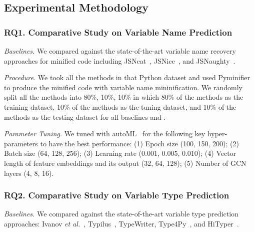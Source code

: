 \subsection{Experimental Methodology}
\label{empirical-method}

\subsubsection{RQ1. Comparative Study on Variable Name Prediction\\}
{\em Baselines.} We compared {\tool} against the state-of-the-art
variable name recovery approaches for minified code including
JSNeat~\cite{tran2019recovering}, JSNice~\cite{JSNice2015}, and
JSNaughty~\cite{JSNaughty2017}.

\textit{Procedure.} We took all the methods in that Python dataset
and used Pyminifier to produce the minified code with variable name
mininification. We randomly split all the methods into 80\%, 10\%,
10\% in which 80\% of the methods as the training dataset, 10\% of the
methods as the tuning dataset, and 10\% of the methods as the testing
dataset for all baselines and {\tool}.


{\em Parameter Tuning.} We tuned {\tool} with autoML~\cite{NNI} for
the following key hyper-parameters to have the best performance: (1)
Epoch size (100, 150, 200); (2) Batch size (64, 128, 256); (3)
Learning rate (0.001, 0.005, 0.010); (4) Vector length of feature
embeddings and its output (32, 64, 128); (5) Number of GCN layers (4,
8, 16).

\subsubsection{RQ2. Comparative Study on Variable Type Prediction\\}

{\em Baselines.} We compared {\tool} against the state-of-the-art
  variable type prediction approaches: Ivanov {\em et
  al.}~\cite{ivanov21predicting}, Typilus~\cite{typilus-pldi20},
  TypeWriter\cite{typewriter-fse20}, Type4Py~\cite{Type4Py-icse22},
  and HiTyper~\cite{HiTyper-icse22}.

